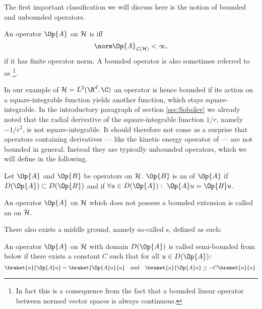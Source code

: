 The first important classification we will discuss here
is the notion of bounded and unbounded operators.
\begin{defn}
	\label{defn:OpBounded}
	An operator $\Op{A}$ on $\mathcal{H}$ is  iff
	\[ \opnorm{\Op{A}} < \infty, \]
	\ie if it has finite operator norm.
	A bounded operator is also sometimes referred to as %
	\footnote{In fact this is a consequence from the fact that a bounded linear operator
	between normed vector spaces is always continuous.}.
\end{defn}
In our example of $\hilbert = L^2(\R^d, \C)$ an operator is hence bounded
if its action on a square-integrable function yields another function,
which stays square-integrable.
In the introductory paragraph of section \vref{sec:Sobolev}
we already noted that the radial derivative of
the square-integrable function $1/r$, namely $-1/r^2$,
is not square-integrable.
It should therefore not come as a surprise that
operators containing derivatives
--- like the kinetic energy operator of \QM ---
are not bounded in general.
Instead they are typically unbounded operators,
which we will define in the following.

\begin{defn}
	Let $\Op{A}$ and $\Op{B}$ be operators on $\mathcal{H}$.
	$\Op{B}$ is an  of $\Op{A}$ if
	\mbox{$D(\Op{A}) \subset D(\Op{B})$}
	and if $\forall u \in D(\Op{A}): \ \Op{A}u = \Op{B}u$.
\end{defn}

\begin{defn}
	An operator $\Op{A}$ on $\mathcal{H}$ which does not possess
	a bounded extension is called an  on $\mathcal{H}$.
\end{defn}

There also exists a middle ground,
namely so-called s, defined as such:
\begin{defn}
	\label{defn:SemiBounded}
	An operator $\Op{A}$ on $\mathcal{H}$ with domain $D(\Op{A})$
	is called semi-bounded from below if there exists a constant $C$
	such that for all $u \in D(\Op{A})$:
	\[ \braket{u}{\Op{A} u} = \braket{\Op{A} u}{u} \quad \text{and}
	\quad \braket{u}{\Op{A} u} \geq -C \braket{u}{u}. \]
\end{defn}

